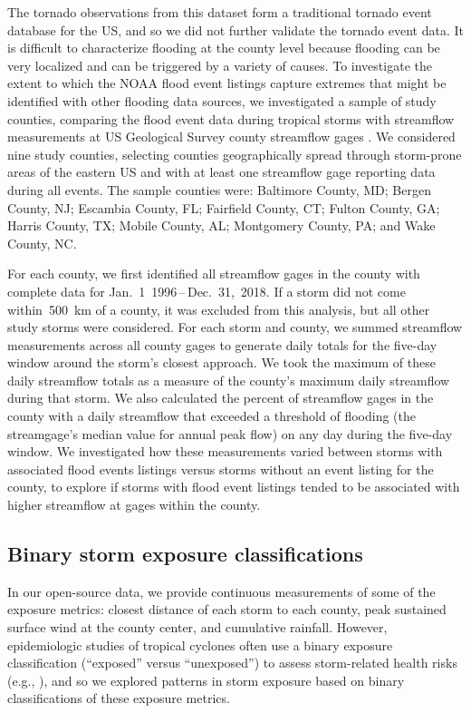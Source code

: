 The tornado observations from this dataset form a traditional tornado event
database for the \ac{US}, and so we did not further validate
the tornado event data. It is difficult to characterize flooding at the county
level because flooding can be very localized and can be triggered by a variety
of causes. To investigate the extent to which the NOAA flood event listings
capture extremes that might be identified with other flooding data sources, we
investigated a sample of study counties, comparing the flood event data during
tropical storms with streamflow measurements at \ac{US} Geological Survey
county streamflow gages \parencite{usgsgages, countyfloods, dataRetrieval}.  
We considered nine study counties, selecting counties geographically spread
through storm-prone areas of the eastern \ac{US} and with at least one streamflow
gage reporting data during all events. The sample counties were: Baltimore County,
MD; Bergen County, NJ; Escambia County, FL; Fairfield County, CT; Fulton
County, GA; Harris County, TX; Mobile County, AL; Montgomery County, PA; and
Wake County, NC. 

For each county, we first identified all streamflow gages in the county with
complete data for Jan.~1~1996\,--\,Dec.~31,~2018. If a storm did not come
within~500~\si{\kilo\metre} of a county, it was excluded from this analysis,
but all other study storms were considered.  For each storm and county, we
summed streamflow measurements across all county gages to generate daily totals
for the five-day window around the storm's closest approach. We took the
maximum of these daily streamflow totals as a measure of the county's maximum
daily streamflow during that storm. We also calculated the percent of
streamflow gages in the county with a daily streamflow that exceeded a
threshold of flooding (the streamgage's median value for annual peak flow) on
any day during the five-day window. We investigated how these measurements
varied between storms with associated flood events listings versus storms
without an event listing for the county, to explore if storms with flood event
listings tended to be associated with higher streamflow at gages within the
county.

\subsection*{Binary storm exposure classifications}

In our open-source data, we provide continuous measurements of some of the
exposure metrics: closest distance of each storm to each county, peak sustained
surface wind at the county center, and cumulative rainfall. However,
epidemiologic studies of tropical cyclones often use a binary exposure
classification (``exposed'' versus ``unexposed'') to assess storm-related
health risks (e.g., \textcite{grabich2015, mckinney2011,
caillouet2008increase}), and so we explored patterns in storm exposure based on
binary classifications of these exposure metrics. 

